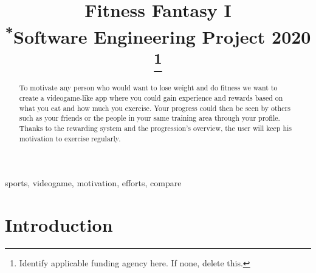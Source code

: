 \documentclass[conference]{IEEEtran}
\begin{document}
\title{Fitness Fantasy I\\
{\footnotesize \textsuperscript{*}Software Engineering Project 2020}
\thanks{Identify applicable funding agency here. If none, delete this.}
}

\author{
\and
{}
\and
{}
}

\maketitle

\begin{abstract}
To motivate any person who would want to lose weight and do fitness we want to create a videogame-like app where you could gain experience and rewards based on what you eat and how much you exercise. Your progress could then be seen by others such as your friends or the people in your same training area through your profile. Thanks to the rewarding system and the progression’s overview, the user will keep his motivation to exercise regularly.
\end{abstract}

\begin{IEEEkeywords}
sports, videogame, motivation, efforts, compare
\end{IEEEkeywords}

\section{Introduction}
\end{document}
